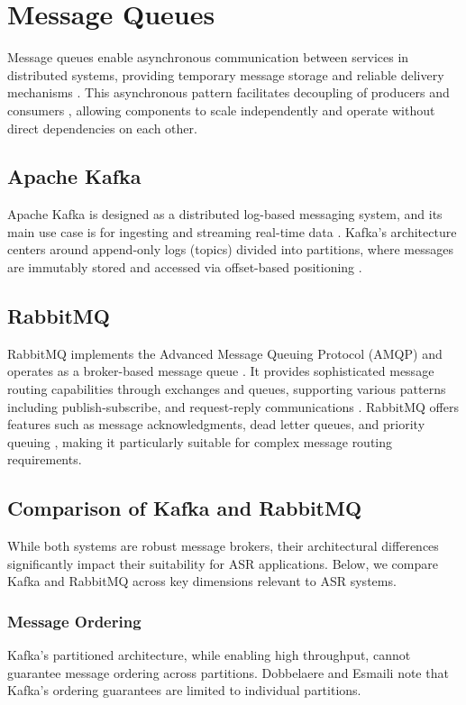 \section{Message Queues}
Message queues enable asynchronous communication between services in distributed systems, providing temporary message storage and reliable delivery mechanisms \cite{queue_definition}. This asynchronous pattern facilitates decoupling of producers and consumers \cite{queue_decouple}, allowing components to scale independently and operate without direct dependencies on each other. 

\subsection{Apache Kafka}
Apache Kafka is designed as a distributed log-based messaging system, and its main use case is for ingesting and streaming real-time data \cite{kafka_definition}. Kafka's architecture centers around append-only logs (topics) divided into partitions, where messages are immutably stored and accessed via offset-based positioning \cite{kafka_documentation}.

\subsection{RabbitMQ}
RabbitMQ implements the Advanced Message Queuing Protocol (AMQP) \cite{rabbitmq_protocols} and operates as a broker-based message queue \cite{rabbitmq_definition}. It provides sophisticated message routing capabilities through exchanges and queues, supporting various patterns including publish-subscribe, and request-reply communications \cite{rabbitmq_routing}. RabbitMQ offers features such as message acknowledgments, dead letter queues, and priority queuing \cite{rabbitmq_routing}, making it particularly suitable for complex message routing requirements.

\subsection{Comparison of Kafka and RabbitMQ}
While both systems are robust message brokers, their architectural differences significantly impact their suitability for ASR applications. Below, we compare Kafka and RabbitMQ across key dimensions relevant to ASR systems.

\subsubsection{Message Ordering}
Kafka's partitioned architecture, while enabling high throughput, cannot guarantee message ordering across partitions. Dobbelaere and Esmaili \cite{kafka_v_rabbitmq} note that Kafka's ordering guarantees are limited to individual partitions.

